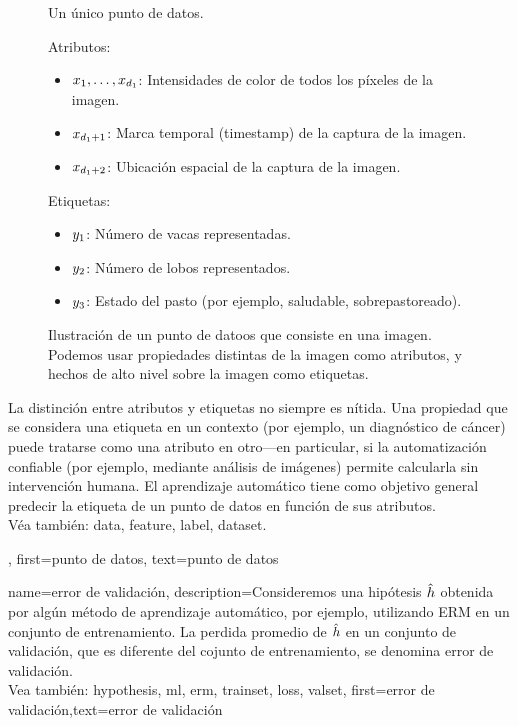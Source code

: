 {{\begin{figure}[H]
\begin{minipage}[t]{0.95\textwidth}
        			\caption*{Un único punto de datos.}
        			\vspace{5mm}
    			\end{minipage}
    			\begin{minipage}[t]{0.95\textwidth}
        			Atributos:
        			\begin{itemize}
            			\item $x_{1},\ldots,x_{d_{1}}$: Intensidades de color de todos los píxeles de la imagen.
            			\item $x_{d_{1}+1}$: Marca temporal (timestamp) de la captura de la imagen.
            			\item $x_{d_{1}+2}$: Ubicación espacial de la captura de la imagen.
        			\end{itemize}
        			Etiquetas:
        			\begin{itemize}
            			\item $y_{1}$: Número de vacas representadas.
            			\item $y_{2}$: Número de lobos representados.
            			\item $y_{3}$: Estado del pasto (por ejemplo, saludable, sobrepastoreado).
        			\end{itemize}
    			\end{minipage}
    			\caption{Ilustración de un punto de datoos que consiste en una imagen. Podemos usar 
    			propiedades distintas de la imagen como atributos, y hechos de alto nivel 
    			sobre la imagen como etiquetas.\label{fig:datapoint_cowherd_dict}}
		\end{figure}
		La distinción entre atributos y etiquetas no siempre es nítida. 
		Una propiedad que se considera una etiqueta en un contexto (por ejemplo, un diagnóstico de cáncer) 
		puede tratarse como una atributo en otro—en particular, si la automatización confiable (por ejemplo, 
		mediante análisis de imágenes) permite calcularla sin intervención humana.
		El aprendizaje automático tiene como objetivo general predecir la etiqueta de un punto de datos
		en función de sus atributos.\\
		Véa también: \gls{data}, \gls{feature}, \gls{label}, \gls{dataset}.}, 
first={punto de datos},
text={punto de datos}  
}


{name={error de validación},
 description={Consideremos una hipótesis $\hat{h}$ obtenida por algún método de
 	aprendizaje automático, por ejemplo, utilizando ERM en un conjunto de entrenamiento. La perdida promedio de
 	$\hat{h}$ en un conjunto de validación, que es diferente del cojunto de entrenamiento, se denomina error de validación.
	 \\
	 Vea también: \gls{hypothesis}, \gls{ml}, \gls{erm}, \gls{trainset}, \gls{loss}, \gls{valset}},
	first={error de validación},text={error de validación}  
}

